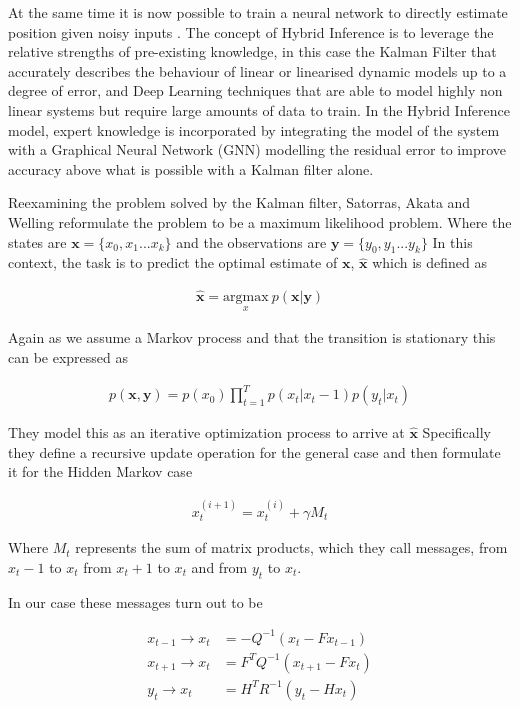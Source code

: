 \documentclass[]{../resources/final_report}
\begin{document}
At the same time it is now possible to train a neural network to directly estimate position given
noisy inputs \cite{NNStateEstimation}. The concept of Hybrid Inference is to leverage the relative 
strengths of pre-existing knowledge, in this case the Kalman Filter that accurately describes the 
behaviour of linear or linearised dynamic models up to a degree of error, and Deep Learning techniques 
that are able to model highly non linear systems but require large amounts of data to train.
In the Hybrid Inference model, expert knowledge is incorporated by integrating the model of the 
system with a Graphical Neural Network (GNN) modelling the residual error to improve accuracy above what is possible with a 
Kalman filter alone.


Reexamining the problem solved by the Kalman filter, Satorras, Akata and Welling reformulate the 
problem to be a maximum likelihood problem\cite{Satorras2019CombiningGA}.
Where the states are $\mathbf{x} = \{x_0, x_1 ... x_k\}$ and the observations are $\mathbf{y} = \{y_0, y_1 ... y_k\}$
In this context, the task is to predict the optimal estimate of $\mathbf{x}$, $\mathbf{\hat{x}}$ which is defined as

\begin{align}
  \mathbf{\hat{x}} = \underset{x}{\text{argmax}}\ p(\mathbf{x}|\mathbf{y})
\end{align}

Again as we assume a Markov process and that the transition is stationary this can be expressed as 

\begin{align}
  p(\mathbf{x},\mathbf{y}) = p(x_0)\prod_{t=1}^T p(x_t|x_t-1) p(y_t|x_t)
\end{align}

They model this as an iterative optimization process to arrive at $\mathbf{\hat{x}}$
Specifically they define a recursive update operation for the general case and then formulate it 
for the Hidden Markov case

\begin{align}
  x_t^{(i+1)} = x_t^{(i)} + \gamma M_t
\end{align}

Where $M_t$ represents the sum of matrix products, which they call messages, from $x_t-1$ to $x_t$ 
from $x_t+1$ to $x_t$ and from $y_t$ to $x_t$.

In our case these messages turn out to be

\begin{align}
  x_{t-1} \rightarrow x_{t} &= -Q^{-1}(x_t - Fx_{t-1}) \\
  x_{t+1} \rightarrow x_{t} &= F^TQ^{-1}(x_{t+1} - Fx_t) \\
  y_t \rightarrow x_t &= H^TR^{-1}(y_t - Hx_t) 
\end{align}
\end{document}

